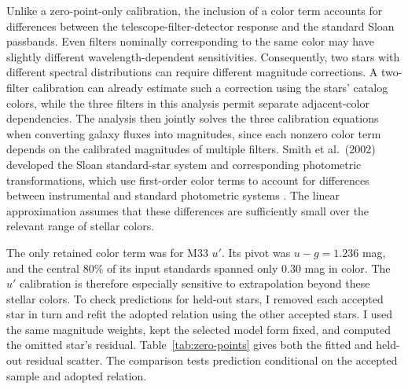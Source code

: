 Unlike a zero-point-only calibration, the inclusion of a color term accounts for differences between the telescope-filter-detector response and the standard Sloan passbands. Even filters nominally corresponding to the same color may have slightly different wavelength-dependent sensitivities. Consequently, two stars with different spectral distributions can require different magnitude corrections. A two-filter calibration can already estimate such a correction using the stars' catalog colors, while the three filters in this analysis permit separate adjacent-color dependencies. The analysis then jointly solves the three calibration equations when converting galaxy fluxes into magnitudes, since each nonzero color term depends on the calibrated magnitudes of multiple filters. Smith et al.\ (2002) developed the Sloan standard-star system and corresponding photometric transformations, which use first-order color terms to account for differences between instrumental and standard photometric systems \citep{methSmith}. The linear approximation assumes that these differences are sufficiently small over the relevant range of stellar colors.

The only retained color term was for M33 $u'$. Its pivot was $u-g=1.236$ mag, and the central 80\% of its input standards spanned only 0.30 mag in color. The $u'$ calibration is therefore especially sensitive to extrapolation beyond these stellar colors. To check predictions for held-out stars, I removed each accepted star in turn and refit the adopted relation using the other accepted stars. I used the same magnitude weights, kept the selected model form fixed, and computed the omitted star's residual. Table~\ref{tab:zero-points} gives both the fitted and held-out residual scatter. The comparison tests prediction conditional on the accepted sample and adopted relation.

